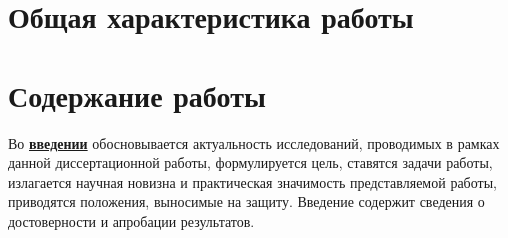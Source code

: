 \section*{Общая характеристика работы}

\newcommand{\actuality}{\pdfbookmark[1]{Актуальность и степень разработанности темы исследования}{actuality}\textbf{\uline{\actualityTXT}}}
\newcommand{\progress}{\pdfbookmark[1]{Разработанность темы}{progress}\underline{\textbf{\progressTXT}}}
\newcommand{\aim}{\pdfbookmark[1]{Цели}{aim}\underline{{\textbf\aimTXT}}}
\newcommand{\tasks}{\pdfbookmark[1]{Задачи}{tasks}\underline{\textbf{\tasksTXT}}}
\newcommand{\aimtasks}{\pdfbookmark[1]{Цели и задачи}{aimtasks}\aimtasksTXT}
\newcommand{\novelty}{\pdfbookmark[1]{Научная новизна}{novelty}\underline{\textbf{\noveltyTXT}}}
\newcommand{\influence}{\pdfbookmark[1]{Практическая значимость}{influence}\underline{\textbf{\influenceTXT}}}
\newcommand{\methods}{\pdfbookmark[1]{Методология и методы исследования}{methods}\underline{\textbf{\methodsTXT}}}
\newcommand{\defpositions}{\pdfbookmark[1]{Положения, выносимые на защиту}{defpositions}\underline{\textbf{\defpositionsTXT}}}
\newcommand{\reliability}{\pdfbookmark[1]{Достоверность}{reliability}\underline{\textbf{\reliabilityTXT}}}
\newcommand{\probation}{\pdfbookmark[1]{Апробация}{probation}\underline{\textbf{\probationTXT}}}
\newcommand{\contribution}{\pdfbookmark[1]{Личный вклад}{contribution}\underline{\textbf{\contributionTXT}}}
\newcommand{\publications}{\pdfbookmark[1]{Публикации}{publications}\underline{\textbf{\publicationsTXT}}}




\section*{Содержание работы}
Во \underline{\textbf{введении}} обосновывается актуальность исследований, проводимых в рамках данной диссертационной работы, формулируется цель, ставятся задачи работы, излагается научная новизна и практическая значимость представляемой работы, приводятся положения, выносимые на защиту. Введение содержит сведения о достоверности и апробации результатов.

